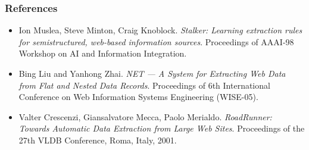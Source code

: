 \documentclass[svgnames]{beamer}
\begin{document}

\begin{frame}
    \frametitle{References}
    
    \begin{itemize}
    \item Ion Muslea, Steve Minton, Craig Knoblock. \emph{Stalker: Learning
          extraction rules for semistructured, web-based information
          sources}. Proceedings of AAAI-98 Workshop on AI and Information
        Integration.
    \item Bing Liu and Yanhong Zhai. \emph{NET --- A System for Extracting Web
          Data from Flat and Nested Data Records}. Proceedings of 6th
        International Conference on Web Information Systems Engineering
        (WISE-05).
    \item Valter Crescenzi, Giansalvatore Mecca, Paolo
        Merialdo. \emph{RoadRunner: Towards Automatic Data Extraction from
          Large Web Sites}. Proceedings of the 27th VLDB Conference, Roma,
        Italy, 2001.
    \end{itemize}

\end{frame}



\end{document}
